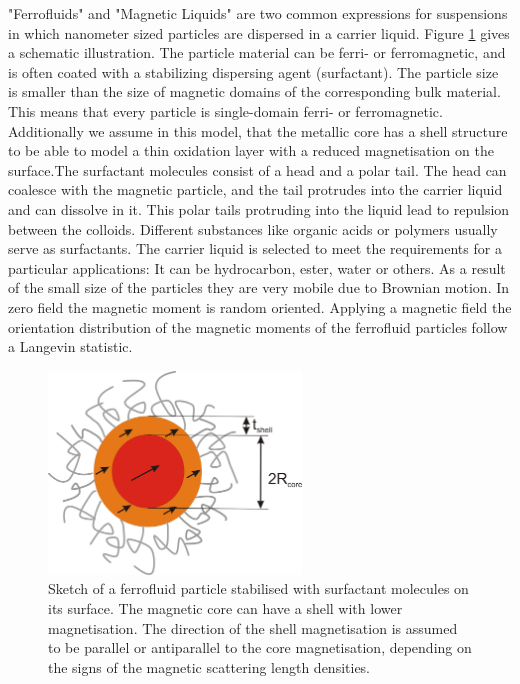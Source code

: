 "Ferrofluids" and "Magnetic Liquids" are two common expressions for
suspensions in which nanometer sized particles are dispersed in a
carrier liquid. Figure \ref{fig:ferrofluidparticle} gives a
schematic illustration. The particle material can be ferri- or
ferromagnetic, and is often coated with a stabilizing dispersing
agent (surfactant). The particle size is smaller than the size of
magnetic domains of the corresponding bulk material. This means that
every particle is single-domain ferri- or ferromagnetic.
Additionally we assume in this model, that the metallic core has a
shell structure to be able to model a thin oxidation layer with a
reduced magnetisation on the surface.The surfactant molecules
consist of a head and a polar tail. The head can coalesce with the
magnetic particle, and the tail protrudes into the carrier liquid
and can dissolve in it. This polar tails protruding into the liquid
lead to repulsion between the colloids. Different substances like
organic acids or polymers usually serve as surfactants. The carrier
liquid is selected to meet the requirements for a particular
applications: It can be hydrocarbon, ester, water or others. As a
result of the small size of the particles they are very mobile due
to Brownian motion. In zero field the magnetic moment is random
oriented. Applying a magnetic field the orientation distribution of
the magnetic moments of the ferrofluid particles follow a Langevin
statistic.

\begin{figure}[htb]
\begin{center}
\includegraphics[width=0.6\textwidth]{../images/form_factor/ferrofluid/ferrfluidparticle.png}
\end{center}
\caption{Sketch of a ferrofluid particle stabilised with surfactant
molecules on its surface. The magnetic core can have a shell with
lower magnetisation. The direction of the shell magnetisation is
assumed to be parallel or antiparallel to the core magnetisation,
depending on the signs of the magnetic scattering length densities.}
\label{fig:ferrofluidparticle}
\end{figure}

